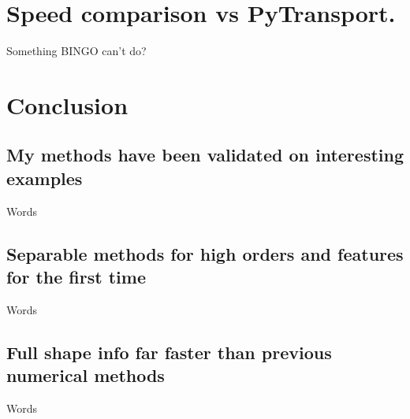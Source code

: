\section{Speed comparison vs PyTransport.}
    Something BINGO can't do?
\newpage
\section{Conclusion}
    \subsection{My methods have been validated on interesting examples}
    Words
    \subsection{Separable methods for high orders and features for the first time}
    Words
    \subsection{Full shape info far faster than previous numerical methods}
    Words

%
%
%

